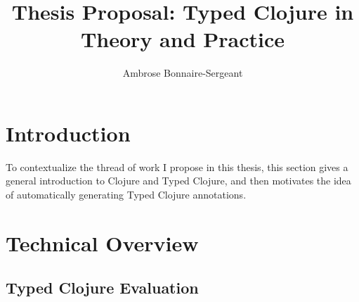 \documentclass[9pt]{extarticle}
\title{Thesis Proposal: Typed Clojure in Theory and Practice}
\author{Ambrose Bonnaire-Sergeant}
\begin{document}
\maketitle

\begin{abstract}
  
\end{abstract}

%
%

\section{Introduction}

To contextualize the thread of work I propose in this thesis, this section
gives a general introduction to Clojure and Typed Clojure, and
then motivates the idea of automatically generating Typed Clojure annotations.



%



\section{Technical Overview}







\subsection{Typed Clojure Evaluation}
\label{sec:casestudy}
\end{document}
